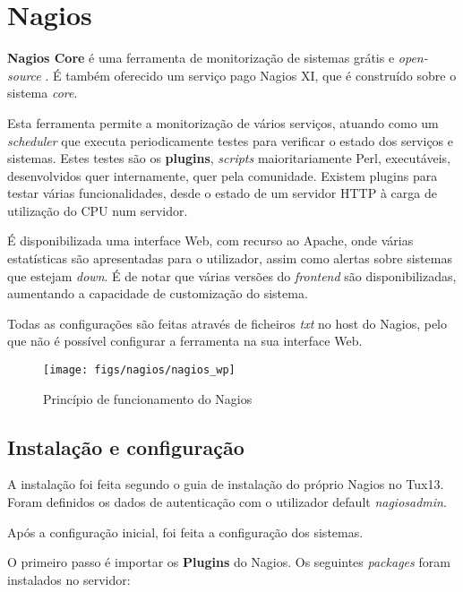 \chapter {Nagios}

\textbf{Nagios Core} é uma ferramenta de monitorização de sistemas grátis e \textit{open-source} \cite{Nagios}.
É também oferecido um serviço pago Nagios XI, que é construído sobre o sistema \textit{core}.

Esta ferramenta permite a monitorização de vários serviços, atuando como um \textit{scheduler} que executa periodicamente testes para verificar o estado dos serviços e sistemas.
Estes testes são os \textbf{plugins}, \textit{scripts} maioritariamente Perl, executáveis, desenvolvidos quer internamente, quer pela comunidade.
Existem plugins para testar várias funcionalidades, desde o estado de um servidor HTTP à carga de utilização do CPU num servidor.

É disponibilizada uma interface Web, com recurso ao Apache, onde várias estatísticas são apresentadas para o utilizador, assim como alertas sobre sistemas que estejam \textit{down}.
É de notar que várias versões do \textit{frontend} são disponibilizadas, aumentando a capacidade de customização do sistema.

Todas as configurações são feitas através de ficheiros \textit{txt} no host do Nagios, pelo que não é possível configurar a ferramenta na sua interface Web.

\begin{figure}[H]
    \centering
    \texttt{[image: figs/nagios/nagios\_wp]}
    \caption{Princípio de funcionamento do Nagios}
    \label{fig:nagios_wp}
\end{figure}

\pagebreak

\section{Instalação e configuração}

A instalação foi feita segundo o guia de instalação do próprio Nagios \cite{Nagios_setup} no Tux13.
Foram definidos os dados de autenticação com o utilizador default \textit{nagiosadmin}.

Após a configuração inicial, foi feita a configuração dos sistemas.

O primeiro passo é importar os \textbf{Plugins} do Nagios.
Os seguintes \textit{packages} foram instalados no servidor:

